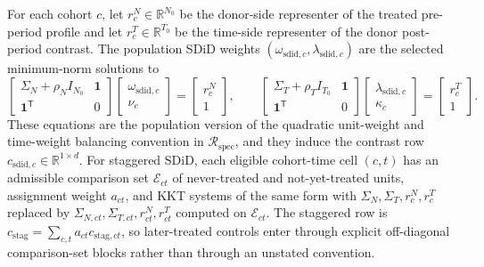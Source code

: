 \documentclass[11pt]{article}
\newcommand{\one}{\mathbf{1}}
\newcommand{\transpose}{\mathsf{T}}
\newcommand{\R}{\mathbb{R}}
\theoremstyle{definition}
\theoremstyle{plain}
\theoremstyle{remark}
\begin{document}
For each cohort \(c\), let \(r^N_c\in\R^{N_0}\) be the donor-side representer of the treated pre-period profile and let \(r^T_c\in\R^{T_0}\) be the time-side representer of the donor post-period contrast.  The population SDiD weights \((\omega_{\mathrm{sdid},c},\lambda_{\mathrm{sdid},c})\) are the selected minimum-norm solutions to
\[
\begin{bmatrix}
\Sigma_N+\rho_N I_{N_0} & \one\\
\one^\transpose & 0
\end{bmatrix}
\begin{bmatrix}\omega_{\mathrm{sdid},c}\\ \nu_c\end{bmatrix}
=
\begin{bmatrix}r^N_c\\ 1\end{bmatrix},
\qquad
\begin{bmatrix}
\Sigma_T+\rho_T I_{T_0} & \one\\
\one^\transpose & 0
\end{bmatrix}
\begin{bmatrix}\lambda_{\mathrm{sdid},c}\\ \kappa_c\end{bmatrix}
=
\begin{bmatrix}r^T_c\\ 1\end{bmatrix}.
\]
These equations are the population version of the quadratic unit-weight and time-weight balancing convention in \(\mathcal R_{\mathrm{spec}}\), and they induce the contrast row \(c_{\mathrm{sdid},c}\in\R^{1\times d}\).  For staggered SDiD, each eligible cohort-time cell \((c,t)\) has an admissible comparison set \(\mathcal E_{ct}\) of never-treated and not-yet-treated units, assignment weight \(a_{ct}\), and KKT systems of the same form with \(\Sigma_N,\Sigma_T,r^N_c,r^T_c\) replaced by \(\Sigma_{N,ct},\Sigma_{T,ct},r^N_{ct},r^T_{ct}\) computed on \(\mathcal E_{ct}\).  The staggered row is \(c_{\mathrm{stag}}=\sum_{c,t}a_{ct}c_{\mathrm{stag},ct}\), so later-treated controls enter through explicit off-diagonal comparison-set blocks rather than through an unstated convention.
\end{document}
